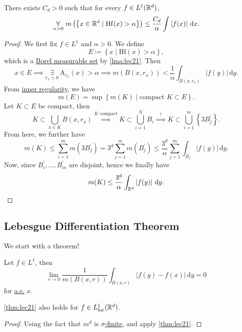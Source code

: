 \begin{theorem}\label{thm:HL-maximal-inequality}
	There exists \(C_{d} >0\) such that for every \(f\in L^1(\mathbb{\MakeUppercase{r}} ^d)\),
	\[
		\underset{\alpha >0}{\forall }\ m\left(\left\{x\in \mathbb{\MakeUppercase{r}} ^d\mid \mathrm{Hf}(x) > \alpha  \right\}\right) \leq \frac{C_{d} }{\alpha }\int \left\vert f(x) \right\vert \,\mathrm{d} x.
	\]
\end{theorem}
\begin{proof}
	We first fix \(f\in L^1\) and \(\alpha >0\). We define
	\[
		E\coloneqq \left\{x\mid \mathrm{Hf} (x) > \alpha \right\},
	\]
	which is a \hyperref[def:A-measurable-set]{Borel measurable set} by \autoref{lma:lec21}. Then
	\[
		x\in E\implies \underset{r_{x} >0}{\exists } \ \mathrm{A} _{r_{x} }(x)> \alpha \implies m(B(x, r_{x} ))< \frac{1}{\alpha }\int _{B(x, r_{x} )}\left\vert f(y) \right\vert \,\mathrm{d} y.
	\]
	From \hyperref[thm:inner-regularity]{inner regularity}, we have
	\[
		m(E) = \sup \left\{m(K)\mid \text{compact }K\subset E \right\}.
	\]
	Let \(K\subset E\) be compact, then
	\[
		K\subset \bigcup\limits_{x\in K}B(x, r_{x} ) \overset{K \text{ compact} }{\implies } K\subset \bigcup\limits_{i=1}^{N} B_{i} \overset{\hyperref[lma:Vitali-type-covering-lemma]{!}}{\implies} K\subset \bigcup\limits_{i=1}^{m} \left\{3 B_{j} ^\prime \right\}.
	\]
	From here, we further have
	\[
		m(K) \leq \sum\limits_{i=1}^{m} m(3 B_{j} ^\prime ) = 3^d \sum\limits_{j=1}^{m} m(B_{j} ^\prime ) \leq \frac{3^d}{\alpha }\sum\limits_{j=1}^{m} \int _{B_{j} ^\prime }\left\vert f(y) \right\vert \,\mathrm{d}y.
	\]
	Now, since \(B^\prime _{i} , \ldots , B^\prime _{m}  \) are disjoint, hence we finally have
	\[
		m(K) \leq \frac{3^d}{\alpha }\int _{\mathbb{\MakeUppercase{r}} ^d}\left\vert f(y) \right\vert \,\mathrm{d} y.
	\]
\end{proof}

\subsection{Lebesgue Differentiation Theorem}
We start with a theorem!
\begin{theorem}\label{thm:lec21}
	Let \(f\in L^1\), then
	\[
		\lim\limits_{r \to 0} \frac{1}{m(B(x, r))}\int_{B(x, r)}\left\vert f(y) - f(x) \right\vert   \,\mathrm{d}y = 0
	\]
	for \hyperref[def:mu-almost-everywhere]{a.e.} \(x\).
\end{theorem}

\begin{corollary}
	\autoref{thm:lec21} also holds for \(f\in L^1_{\text{loc}}(\mathbb{\MakeUppercase{r}} ^d)\).
\end{corollary}
\begin{proof}
	Using the fact that \(m^d\) is \hyperref[def:finite-measure]{\(\sigma \)-finite}, and apply \autoref{thm:lec21}.
\end{proof}

